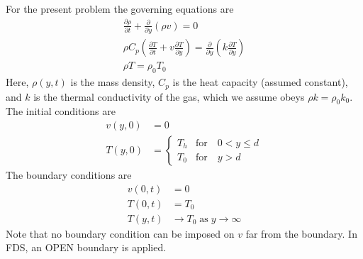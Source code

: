 \documentclass[11pt]{book}
\begin{document}
For the present problem the governing equations are
\begin{gather}
\frac{\partial \rho}{\partial t} + \frac{\partial}{\partial y}(\rho v) = 0 \\
\rho C_p \left( \frac{\partial T}{\partial t} + v \frac{\partial T}{\partial y} \right) = \frac{\partial}{\partial y} \left( k \frac{\partial T}{\partial y} \right) \\
\rho T = \rho_0 T_0
\end{gather}
Here, $\rho(y,t)$ is the mass density, $C_p$ is the heat capacity (assumed constant), and $k$ is the thermal conductivity of the gas, which we assume obeys $\rho k = \rho_0 k_0$. The initial conditions are
\begin{align}
v(y,0) &= 0 \\
T(y,0) &= \left\{ \begin{array}{ll} T_h & \mbox{for} \quad 0 < y \le d \\ T_0 & \mbox{for} \quad y > d \end{array} \right.
\end{align}
The boundary conditions are
\begin{align}
v(0,t) &= 0 \\
T(0,t) &= T_0 \\
T(y,t) &\rightarrow T_0 \;\mbox{as}\; y\rightarrow\infty
\end{align}
Note that no boundary condition can be imposed on $v$ far from the boundary.  In FDS, an {\ct OPEN} boundary is applied.
\end{document}

